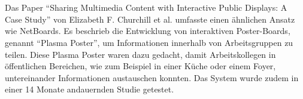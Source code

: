 \\\\
Das Paper ``Sharing Multimedia Content with Interactive Public Displays: A Case Study'' von Elizabeth F. Churchill et al. \cite{churchill:2003,churchill:2004} umfasste einen ähnlichen Ansatz wie NetBoards.
Es beschrieb die Entwicklung von interaktiven Poster-Boards, genannt ``Plasma Poster'', um Informationen innerhalb von Arbeitsgruppen zu teilen.
Diese Plasma Poster waren dazu gedacht, damit Arbeitskollegen in öffentlichen Bereichen, wie zum Beispiel in einer Küche oder einem Foyer, untereinander Informationen austauschen konnten.
Das System wurde zudem in einer 14 Monate andauernden Studie getestet.